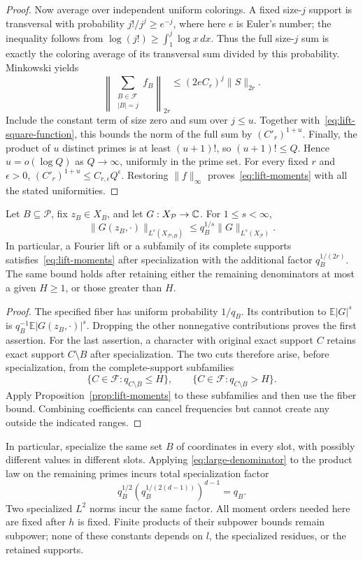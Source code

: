 \begin{proof}
Now average over independent uniform colorings.  A fixed size-\(j\) support is
transversal with probability \(j!/j^j\ge e^{-j}\), where here \(e\)
is Euler's number; the inequality follows from
\(\log(j!)\ge\int_1^j\log x\,dx\).
Thus the full size-\(j\) sum is exactly the coloring average of its
transversal sum divided by this probability.  Minkowski yields
\[
 \left\|\sum_{\substack{B\in\mathcal F\\|B|=j}}f_B\right\|_{2r}
 \le(2eC_r)^j\|S\|_{2r}.
\]
Include the constant term of size zero and sum over \(j\le u\).
Together with~\eqref{eq:lift-square-function}, this bounds the norm of
the full sum by \((C'_r)^{1+u}\).
Finally, the product of \(u\) distinct primes is at least \((u+1)!\),
so \((u+1)!\le Q\).  Hence \(u=o(\log Q)\) as \(Q\to\infty\),
uniformly in the prime set.  For every fixed \(r\) and \(\epsilon>0\),
\((C'_r)^{1+u}\le C_{r,\epsilon}Q^\epsilon\).
Restoring \(\|f\|_\infty\) proves~\eqref{eq:lift-moments} with all the stated
uniformities.
\end{proof}

\begin{lemma}
\label{lem:lift-specialization}
Let \(B\subseteq\mathcal P\), fix \(z_B\in X_B\), and let
\(G:X_{\mathcal P}\to\mathbb C\).  For \(1\le s<\infty\),
\[
 \|G(z_B,\cdot)\|_{L^s(X_{\mathcal P\setminus B})}
 \le q_B^{1/s}\|G\|_{L^s(X_{\mathcal P})}.
\]
In particular, a Fourier lift or a subfamily of its complete supports
satisfies~\eqref{eq:lift-moments} after specialization with the additional factor
\(q_B^{1/(2r)}\).  The same bound holds after retaining either the
remaining denominators at most a given \(H\ge1\), or those greater
than \(H\).
\end{lemma}

\begin{proof}
The specified fiber has uniform probability \(1/q_B\).  Its contribution
to \(\mathbb E|G|^s\) is
\(q_B^{-1}\mathbb E|G(z_B,\cdot)|^s\).  Dropping the other nonnegative
contributions proves the first assertion.  For the last assertion,
a character with original exact support \(C\) retains exact support
\(C\setminus B\) after specialization.  The two cuts therefore arise,
before specialization, from the complete-support subfamilies
\[
 \{C\in\mathcal F:q_{C\setminus B}\le H\},
 \qquad
 \{C\in\mathcal F:q_{C\setminus B}>H\}.
\]
Apply Proposition~\ref{prop:lift-moments} to these subfamilies and then use
the fiber bound.  Combining coefficients can cancel frequencies but
cannot create any outside the indicated ranges.
\end{proof}

In particular, specialize the same set \(B\) of coordinates in every
slot, with possibly different values in different slots.  Applying
\eqref{eq:large-denominator} to the product law on the remaining primes
incurs total specialization factor
\[
 q_B^{1/2}\left(q_B^{1/(2(d-1))}\right)^{d-1}=q_B.
\]
Two specialized \(L^2\) norms incur the same factor.  All moment orders
needed here are fixed after \(h\) is fixed.  Finite products of their
subpower bounds remain subpower; none of these constants depends on
\(l\), the specialized residues, or the retained supports.
